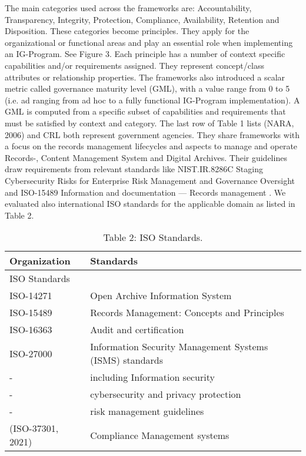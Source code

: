 The main categories used across the frameworks are: Accountability, Transparency, Integrity, Protection, Compliance, Availability, Retention and Disposition. These categories become principles. They apply for the organizational or functional areas and play an essential role when implementing an IG-Program. See Figure 3. Each principle has a number of context specific capabilities and/or requirements assigned. They represent concept/class attributes or relationship properties. The frameworks also introduced a scalar metric called governance maturity level (GML), with a value range from 0 to 5 (i.e. ad ranging from ad hoc to a fully functional IG-Program implementation). A GML is computed from a specific subset of capabilities and requirements that must be satisfied by context and category. The last row of Table 1 lists (NARA, 2006) and CRL both represent government agencies. They share frameworks with a focus on the records management lifecycles and aspects to manage and operate Records-, Content Management System and Digital Archives. Their guidelines draw requirements from relevant standards like NIST.IR.8286C Staging Cybersecurity Risks for Enterprise Risk Management and Governance Oversight \cite{Quinn2022} and ISO-15489 Information and documentation — Records management \cite{ISO15489}. We evaluated also international ISO standards for the applicable domain as listed in Table 2. 
\begin{table}[h]
\caption{Table 2: ISO Standards.}
\label{tab:example1} \centering
 \scalebox{0.55} {\begin{tabular}{|l|l|}
 \hline
  {Organization} & {Standards}\\
  \hline
  {ISO Standards}	 & {}\\
  \hline
  {ISO-14271} & {Open Archive Information System}\\
  \hline
  {ISO-15489} & {Records Management: Concepts and Principles} \\
  \hline
  {ISO-16363}	& {Audit and certification} \\
  \hline
  {ISO-27000} & {Information Security Management Systems (ISMS) standards} \\
  \hline 
  {-}  & {including Information security} \\
  {-}  & {cybersecurity and privacy protection } \\
  {-}  & {risk management guidelines} \\
  {(ISO-37301, 2021)}  & {Compliance Management systems } \\
  \hline
 \end{tabular}}
\end{table}
